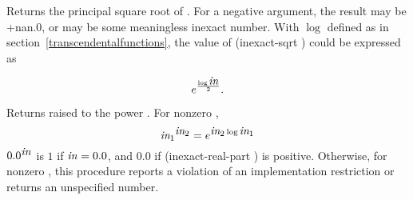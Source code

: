 \begin{entry}{%
}

Returns the principal square root of . For a negative argument,
the result may be {\cf +nan.0}, or may be some meaningless inexact
number.  With $\log$ defined as in
section~\ref{transcendentalfunctions}, the value of {\cf (inexact-sqrt
  )} could be expressed as

\begin{displaymath}
e^{\frac{\log \var{in}}{2}}.
\end{displaymath}
\end{entry}

\begin{entry}{%
}

Returns  raised to the power .  For nonzero
,
%
\begin{displaymath}
  \vari{in}^{\varii{in}} = e^{\varii{in} \log \vari{in}}
\end{displaymath}
%
$0.0^{\var{in}}$ is $1$ if $\var{in} = 0.0$, and $0.0$ if {\cf
  (inexact-real-part )} is positive.  Otherwise,
for nonzero , this
procedure reports a violation of an implementation restriction or
returns an unspecified number.
\end{entry}

